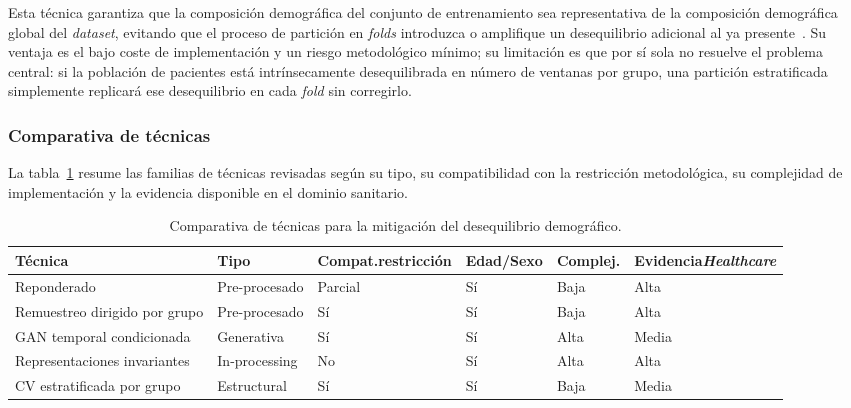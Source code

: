 Esta técnica garantiza que la composición demográfica del conjunto de entrenamiento sea representativa de la composición demográfica global del \emph{dataset}, evitando que el proceso de partición en \emph{folds} introduzca o amplifique un desequilibrio adicional al ya presente~\cite{yang2024datasetrepresentativeness}. Su ventaja es el bajo coste de implementación y un riesgo metodológico mínimo; su limitación es que por sí sola no resuelve el problema central: si la población de pacientes está intrínsecamente desequilibrada en número de ventanas por grupo, una partición estratificada simplemente replicará ese desequilibrio en cada \emph{fold} sin corregirlo.

\subsubsection{Comparativa de técnicas}
\label{subsec:comparativa_balanceo_demografico}

La tabla~\ref{tab:comparativa_balanceo_demografico} resume las familias de técnicas revisadas según su tipo, su compatibilidad con la restricción metodológica, su complejidad de implementación y la evidencia disponible en el dominio sanitario.


\begin{table}[htbp]
\centering
\caption{Comparativa de técnicas para la mitigación del desequilibrio demográfico.}
\label{tab:comparativa_balanceo_demografico}
\renewcommand{\arraystretch}{1.2}
\begin{tabular}{p{3.0cm}p{2.0cm}p{2.8cm}p{1.4cm}p{1.7cm}p{2.0cm}}
\toprule
\textbf{Técnica} &
\textbf{Tipo} &
\textbf{Compat.\newline restricción} &
\textbf{Edad/\newline Sexo} &
\textbf{Complej.} &
\textbf{Evidencia\newline \emph{Healthcare}} \\
\midrule
Reponderado & Pre-procesado & Parcial & Sí & Baja & Alta \\
Remuestreo dirigido por grupo & Pre-procesado & Sí & Sí & Baja & Alta \\
GAN temporal condicionada & Generativa & Sí & Sí & Alta & Media \\
{Representaciones invariantes} & In-processing & No & Sí & Alta & Alta \\   %
CV estratificada por grupo & Estructural & Sí & Sí & Baja & Media \\
\bottomrule
\end{tabular}
\end{table}

